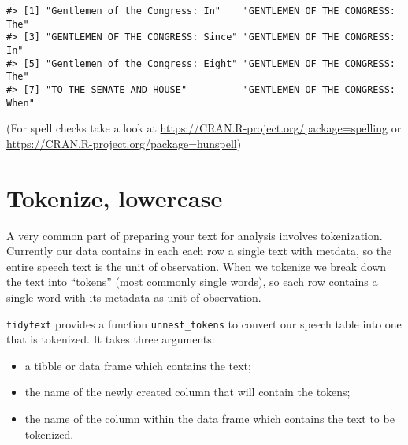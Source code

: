 \documentclass[]{book}
\newenvironment{Shaded}{\begin{snugshade}}{\end{snugshade}}
\newcommand{\CharTok}[1]{\textcolor[rgb]{0.31,0.60,0.02}{#1}}
\newcommand{\CommentTok}[1]{\textcolor[rgb]{0.56,0.35,0.01}{\textit{#1}}}
\newcommand{\DataTypeTok}[1]{\textcolor[rgb]{0.13,0.29,0.53}{#1}}
\newcommand{\DecValTok}[1]{\textcolor[rgb]{0.00,0.00,0.81}{#1}}
\newcommand{\KeywordTok}[1]{\textcolor[rgb]{0.13,0.29,0.53}{\textbf{#1}}}
\newcommand{\NormalTok}[1]{#1}
\newcommand{\OperatorTok}[1]{\textcolor[rgb]{0.81,0.36,0.00}{\textbf{#1}}}
\newcommand{\StringTok}[1]{\textcolor[rgb]{0.31,0.60,0.02}{#1}}
\providecommand{\tightlist}{%
  \setlength{\itemsep}{0pt}\setlength{\parskip}{0pt}}
\begin{document}
\begin{Shaded}
\end{Shaded}

\begin{verbatim}
#> [1] "Gentlemen of the Congress: In"    "GENTLEMEN OF THE CONGRESS: The"  
#> [3] "GENTLEMEN OF THE CONGRESS: Since" "GENTLEMEN OF THE CONGRESS: In"   
#> [5] "Gentlemen of the Congress: Eight" "GENTLEMEN OF THE CONGRESS: The"  
#> [7] "TO THE SENATE AND HOUSE"          "GENTLEMEN OF THE CONGRESS: When"
\end{verbatim}

(For spell checks take a look at \url{https://CRAN.R-project.org/package=spelling} or \url{https://CRAN.R-project.org/package=hunspell})

\hypertarget{tokenize-lowercase}{%
\section{Tokenize, lowercase}\label{tokenize-lowercase}}

A very common part of preparing your text for analysis involves tokenization. Currently our data contains in each each row a single text with metdata, so the entire speech text is the unit of observation. When we tokenize we break down the text into ``tokens'' (most commonly single words), so each row contains a single word with its metadata as unit of observation.

\texttt{tidytext} provides a function \texttt{unnest\_tokens} to convert our speech table into one that is tokenized. It takes three arguments:

\begin{itemize}
\tightlist
\item
  a tibble or data frame which contains the text;
\item
  the name of the newly created column that will contain the tokens;
\item
  the name of the column within the data frame which contains the text to be tokenized.
\end{itemize}
\end{document}
